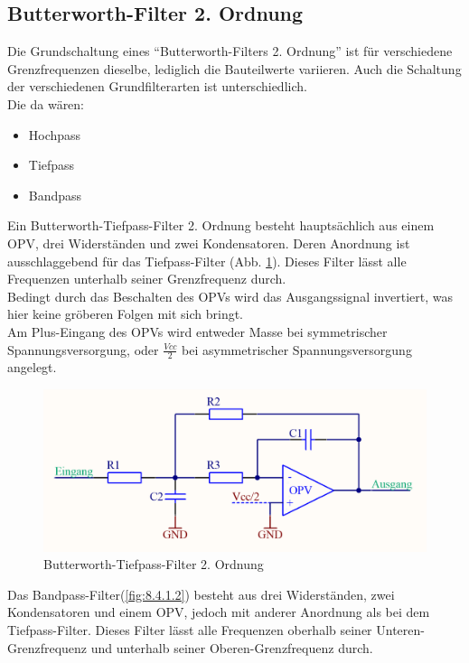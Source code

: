 \subsection{Butterworth-Filter 2. Ordnung}\label{subsec:8.4.1}
Die Grundschaltung eines \enquote{Butterworth-Filters 2. Ordnung} ist für verschiedene Grenzfrequenzen dieselbe, lediglich die Bauteilwerte variieren.
Auch die Schaltung der verschiedenen Grundfilterarten ist unterschiedlich. \\
Die da wären: 
\begin{itemize}
	\item Hochpass
	\item Tiefpass
	\item Bandpass
\end{itemize}
Ein Butterworth-Tiefpass-Filter 2. Ordnung besteht hauptsächlich aus einem OPV, drei Widerständen und zwei Kondensatoren.
Deren Anordnung ist ausschlaggebend für das Tiefpass-Filter (Abb. \ref{fig:8.4.1.1}).
Dieses Filter lässt alle Frequenzen unterhalb seiner Grenzfrequenz durch.\\ 
Bedingt durch das Beschalten des OPVs wird das Ausgangssignal invertiert, was hier keine gröberen Folgen mit sich bringt.\\ 
Am Plus-Eingang des OPVs wird entweder Masse bei symmetrischer Spannungsversorgung, oder $\frac{Vcc}{2}$ bei asymmetrischer Spannungsversorgung angelegt.
\begin{figure} [H]
	\centering
	\includegraphics[width=1\textwidth]{img/Print3/TPFilterButterworth2Ordnung.PNG}
	\caption{Butterworth-Tiefpass-Filter 2. Ordnung}
	\label {fig:8.4.1.1}
\end{figure}
Das Bandpass-Filter(\ref{fig:8.4.1.2}) besteht aus drei Widerständen, zwei Kondensatoren und einem OPV, jedoch mit anderer Anordnung als bei dem Tiefpass-Filter.
Dieses Filter lässt alle Frequenzen oberhalb seiner Unteren-Grenzfrequenz und unterhalb seiner Oberen-Grenzfrequenz durch.
